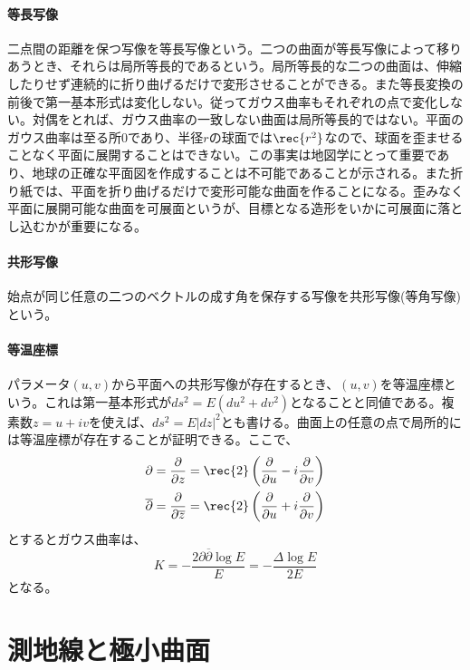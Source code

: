     \paragraph{等長写像}
        二点間の距離を保つ写像を等長写像という。二つの曲面が等長写像によって移りあうとき、それらは局所等長的であるという。局所等長的な二つの曲面は、伸縮したりせず連続的に折り曲げるだけで変形させることができる。また等長変換の前後で第一基本形式は変化しない。従ってガウス曲率もそれぞれの点で変化しない。対偶をとれば、ガウス曲率の一致しない曲面は局所等長的ではない。平面のガウス曲率は至る所0であり、半径$r$の球面では$\rec{r^2}$なので、球面を歪ませることなく平面に展開することはできない。この事実は地図学にとって重要であり、地球の正確な平面図を作成することは不可能であることが示される。また折り紙では、平面を折り曲げるだけで変形可能な曲面を作ることになる。歪みなく平面に展開可能な曲面を可展面というが、目標となる造形をいかに可展面に落とし込むかが重要になる。
    \paragraph{共形写像}
        始点が同じ任意の二つのベクトルの成す角を保存する写像を共形写像(等角写像)という。
    \paragraph{等温座標}
        パラメータ$(u,v)$から平面への共形写像が存在するとき、$(u,v)$を等温座標という。これは第一基本形式が$ds^2 = E(du^2+dv^2)$となることと同値である。複素数$z=u+iv$を使えば、$ds^2=E|dz|^2$とも書ける。曲面上の任意の点で局所的には等温座標が存在することが証明できる。ここで、
        \begin{align*}
            \partial = \pd[]{z} = \rec{2}\lr{\pd[]{u}-i\pd[]{v}}\\
            \overline{\partial} = \pd[]{\overline{z}}
            = \rec{2}\lr{\pd[]{u}+i\pd[]{v}}
        \end{align*}
        とするとガウス曲率は、
            \[K = -\frac{2\partial\overline{\partial}\log E}{E}
            = -\frac{\Delta \log E}{2E}\]
        となる。
        
        
\section{測地線と極小曲面}
